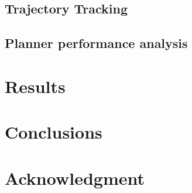 \documentclass[conference]{IEEEtran}
\begin{document}










\subsection{Trajectory Tracking}
\subsection{Planner performance analysis}
\section{Results}
\label{Sec::results}

\section{Conclusions}
\label{Sec::conclusions}

\section*{Acknowledgment}





\vspace{12pt}
\end{document}
